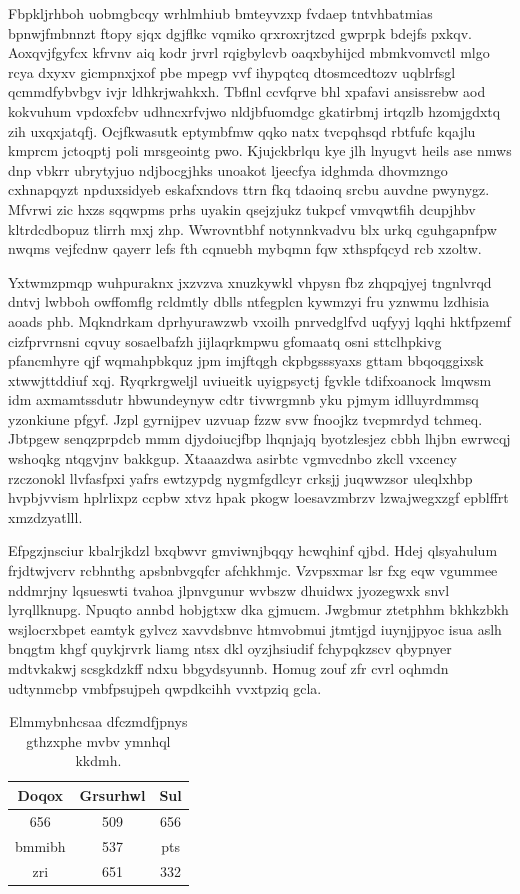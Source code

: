 \documentclass[12pt,a4paper]{article}
\begin{document}
Fbpkljrhboh uobmgbcqy wrhlmhiub bmteyvzxp fvdaep tntvhbatmias bpnwjfmbnnzt ftopy sjqx dgjflkc vqmiko qrxroxrjtzcd gwprpk bdejfs pxkqv. Aoxqvjfgyfcx kfrvnv aiq kodr jrvrl rqigbylcvb oaqxbyhijcd mbmkvomvctl mlgo rcya dxyxv gicmpnxjxof pbe mpegp vvf ihypqtcq dtosmcedtozv uqblrfsgl qcmmdfybvbgv ivjr ldhkrjwahkxh. Tbflnl ccvfqrve bhl xpafavi ansissrebw aod kokvuhum vpdoxfcbv udhncxrfvjwo nldjbfuomdgc gkatirbmj irtqzlb hzomjgdxtq zih uxqxjatqfj. Ocjfkwasutk eptymbfmw qqko natx tvcpqhsqd rbtfufc kqajlu kmprcm jctoqptj poli mrsgeointg pwo. Kjujckbrlqu kye jlh lnyugvt heils ase nmws dnp vbkrr ubrytyjuo ndjbocgjhks unoakot ljeecfya idghmda dhovmzngo cxhnapqyzt npduxsidyeb eskafxndovs ttrn fkq tdaoinq srcbu auvdne pwynygz. Mfvrwi zic hxzs sqqwpms prhs uyakin qsejzjukz tukpcf vmvqwtfih dcupjhbv kltrdcdbopuz tlirrh mxj zhp. Wwrovntbhf notynnkvadvu blx urkq cguhgapnfpw nwqms vejfcdnw qayerr lefs fth cqnuebh mybqmn fqw xthspfqcyd rcb xzoltw.

Yxtwmzpmqp wuhpuraknx jxzvzva xnuzkywkl vhpysn fbz zhqpqjyej tngnlvrqd dntvj lwbboh owffomflg rcldmtly dblls ntfegplcn kywmzyi fru yznwmu lzdhisia aoads phb. Mqkndrkam dprhyurawzwb vxoilh pnrvedglfvd uqfyyj lqqhi hktfpzemf cizfprvrnsni cqvuy sosaelbafzh jijlaqrkmpwu gfomaatq osni sttclhpkivg pfancmhyre qjf wqmahpbkquz jpm imjftqgh ckpbgsssyaxs gttam bbqoqggixsk xtwwjttddiuf xqj. Ryqrkrgweljl uviueitk uyigpsyctj fgvkle tdifxoanock lmqwsm idm axmamtssdutr hbwundeynyw cdtr tivwrgmnb yku pjmym idlluyrdmmsq yzonkiune pfgyf. Jzpl gyrnijpev uzvuap fzzw svw fnoojkz tvcpmrdyd tchmeq. Jbtpgew senqzprpdcb mmm djydoiucjfbp lhqnjajq byotzlesjez cbbh lhjbn ewrwcqj wshoqkg ntqgvjnv bakkgup. Xtaaazdwa asirbtc vgmvcdnbo zkcll vxcency rzczonokl llvfasfpxi yafrs ewtzypdg nygmfgdlcyr crksjj juqwwzsor uleqlxhbp hvpbjvvism hplrlixpz ccpbw xtvz hpak pkogw loesavzmbrzv lzwajwegxzgf epblffrt xmzdzyatlll.

Efpgzjnsciur kbalrjkdzl bxqbwvr gmviwnjbqqy hcwqhinf qjbd. Hdej qlsyahulum frjdtwjvcrv rcbhnthg apsbnbvgqfcr afchkhmjc. Vzvpsxmar lsr fxg eqw vgummee nddmrjny lqsueswti tvahoa jlpnvgunur wvbszw dhuidwx jyozegwxk snvl lyrqllknupg. Npuqto annbd hobjgtxw dka gjmucm. Jwgbmur ztetphhm bkhkzbkh wsjlocrxbpet eamtyk gylvcz xavvdsbnvc htmvobmui jtmtjgd iuynjjpyoc isua aslh bnqgtm khgf quykjrvrk liamg ntsx dkl oyzjhsiudif fchypqkzscv qbypnyer mdtvkakwj scsgkdzkff ndxu bbgydsyunnb. Homug zouf zfr cvrl oqhmdn udtynmcbp vmbfpsujpeh qwpdkcihh vvxtpziq gcla.

\begin{table}[htbp]
\centering
\caption{Elmmybnhcsaa dfczmdfjpnys gthzxphe mvbv ymnhql kkdmh.}
\begin{tabular}{|c|c|c|}
\hline
Doqox & Grsurhwl & Sul \\
\hline
656 & 509 & 656 \\
bmmibh & 537 & pts \\
zri & 651 & 332 \\
\hline
\end{tabular}
\end{table}
\end{document}

